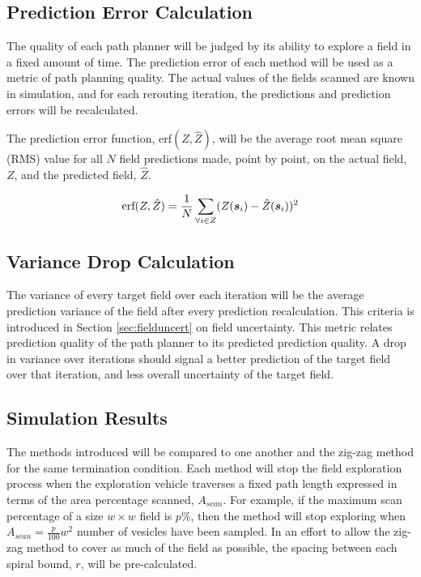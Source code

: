 \subsection{Prediction Error Calculation}
The quality of each path planner will be judged by its ability to explore a field in a fixed amount of time. The prediction error of each method will be used as a metric of path planning quality. The actual values of the fields scanned are known in simulation, and for each rerouting iteration, the predictions and prediction errors will be recalculated.

The prediction error function, erf$(Z,\hat{Z})$, will be the average root mean square (RMS) value for all $N$ field predictions made, point by point, on the actual field, $Z$, and the predicted field, $\hat{Z}$.

\begin{equation}
\text{erf}(Z, \hat{Z}) = \frac{1}{N}\sum_{\forall i \in Z} (Z({\it{\boldsymbol{s}}}_i) - \hat{Z}({\it{\boldsymbol{s}}}_i))^2
\end{equation}

\subsection{Variance Drop Calculation}
The variance of every target field over each iteration will be the average prediction variance of the field after every prediction recalculation. This criteria is introduced in Section \ref{sec:fielduncert} on field uncertainty. This metric relates prediction quality of the path planner to its predicted prediction quality. A drop in variance over iterations should signal a better prediction of the target field over that iteration, and less overall uncertainty of the target field.

\subsection{Simulation Results}
The methods introduced will be compared to one another and the zig-zag method for the same termination condition. Each method will stop the field exploration process when the exploration vehicle traverses a fixed path length expressed in terms of the area percentage scanned, $A_{scan}$. For example, if the maximum scan percentage of a size $w \times w$ field is $p\%$, then the method will stop exploring when $A_{scan} = \frac{p}{100}w^2$ number of vesicles have been sampled. In an effort to allow the zig-zag method to cover as much of the field as possible, the spacing between each spiral bound, $r$, will be pre-calculated.

